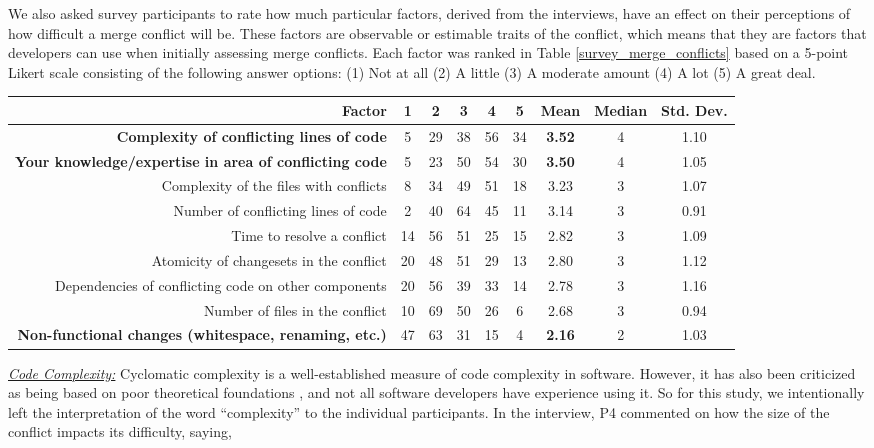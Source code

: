 We also asked survey participants to rate how much particular factors, derived from the interviews, have an effect on their perceptions of how difficult a merge conflict will be. These factors are observable or estimable traits of the conflict, which means that they are factors that developers can use when initially assessing merge conflicts.
Each factor was ranked in Table \ref{survey_merge_conflicts} based on a 5-point Likert scale consisting of the following answer options:
(1) Not at all (2) A little (3) A moderate amount (4) A lot (5) A great deal.

\begin{table*}[!]
\renewcommand{\arraystretch}{1.3}
\caption{Factors of Merge Conflict Difficulty from Survey}
\label{survey_merge_conflicts}
\centering
\begin{tabularx}{0.78\textwidth}{r | *5{c} | *3{c}}

\toprule
	Factor & 1 & 2 & 3 & 4 & 5 & Mean & Median & Std. Dev. \\
\midrule
	\textbf{Complexity of conflicting lines of code} & 5 & 29 & 38 & 56 & 34 & \textbf{3.52} & 4 & 1.10 \\
	\textbf{Your knowledge/expertise in area of conflicting code} & 5 & 23 & 50 & 54 & 30 & \textbf{3.50} & 4 & 1.05 \\
	Complexity of the files with conflicts & 8 & 34 & 49 & 51 & 18 & 3.23 & 3 & 1.07 \\
	Number of conflicting lines of code & 2 & 40 & 64 & 45 & 11 & 3.14 & 3 & 0.91 \\
	Time to resolve a conflict & 14 & 56 & 51 & 25 & 15 & 2.82 & 3 & 1.09 \\
	Atomicity of changesets in the conflict & 20 & 48 & 51 & 29 & 13 & 2.80 & 3 & 1.12 \\
	Dependencies of conflicting code on other components & 20 & 56 & 39 & 33 & 14 & 2.78 & 3 & 1.16 \\
	Number of files in the conflict & 10 & 69 & 50 & 26 & 6 & 2.68 & 3 & 0.94 \\
	\textbf{Non-functional changes (whitespace, renaming, etc.)} & 47 & 63 & 31 & 15 & 4 & \textbf{2.16} & 2 & 1.03 \\
\bottomrule
\end{tabularx}
\end{table*}

\underline{\textit{Code Complexity:}} Cyclomatic complexity \cite{mccabe1976complexity} is a well-established measure of code complexity in software. However, it has also been criticized as being based on poor theoretical foundations \cite{Shepperd1988}, and not all software developers have experience using it. So for this study, we intentionally left the interpretation of the word ``complexity'' to the individual participants.
In the interview, P4 commented on how the size of the conflict impacts its difficulty, saying,

